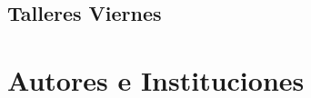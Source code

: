 \documentclass[a4paper, 12pt]{memoir}
\begin{document}


\chapter{Talleres Viernes}



\backmatter


\part{Autores e Instituciones}

\pagestyle{index}

\renewcommand{\indexname}{Índice de autores}

\printindex

\renewcommand{\indexname}{Índice de Instituciones}

\printindex[inst]
\end{document}
